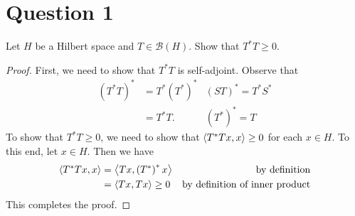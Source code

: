 \section{Question 1}
\horz

Let $H$ be a Hilbert space and $T\in \mathcal B(H).$ Show that $T^*T \geqslant 0.$

\horz

\begin{proof}
    First, we need to show that $T^{*}T$ is self-adjoint. Observe that
    \begin{align*}
	\left( T^{*}T \right)^{*} &= T^{*} \left( T^{*} \right)^{*} & (ST)^{*} = T^{*} S ^{*} \\
	&= T^{*} T. & \left( T^{*} \right)^{*} = T
    \end{align*}
    To show that $T^{*}T \ge 0$, we need to show that $\left\langle T^{*} T x, x \right\rangle \ge 0$ for each $x\in H$. To this end, let $x\in H$. Then we have
    \begin{align*}
	\left\langle T^{*}Tx, x \right\rangle &= \left\langle Tx, \left( T^{*} \right)^{*} x \right\rangle & \text{by definition} \\
	&= \left\langle Tx , Tx \right\rangle \ge 0 & \text{by definition of inner product}
    \end{align*}
    This completes the proof.
\end{proof}
